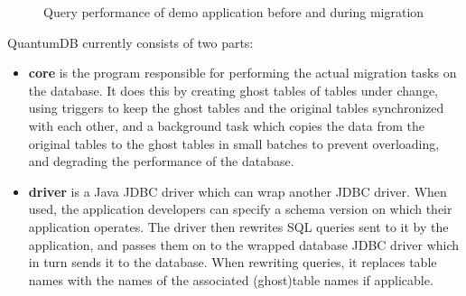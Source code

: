\documentclass[conference]{IEEEtran}
\begin{document}
\begin{figure}%
    \centering
    \qquad
    \qquad
    \caption{Query performance of demo application before and during migration}%
    \label{fig:migration-stages}%
\end{figure}

QuantumDB currently consists of two parts: 
\begin{itemize}
  \item{\textbf{core} is the program responsible for performing the actual migration tasks on the database. It does this by creating ghost tables of tables under change, using triggers to keep the ghost tables and the original tables synchronized with each other, and a background task which copies the data from the original tables to the ghost tables in small batches to prevent overloading, and degrading the performance of the database.}
  \item{\textbf{driver} is a Java JDBC driver which can wrap another JDBC driver. When used, the application developers can specify a schema version on which their application operates. The driver then rewrites SQL queries sent to it by the application, and passes them on to the wrapped database JDBC driver which in turn sends it to the database. When rewriting queries, it replaces table names with the names of the associated (ghost)table names if applicable.}
\end{itemize}
\end{document}

